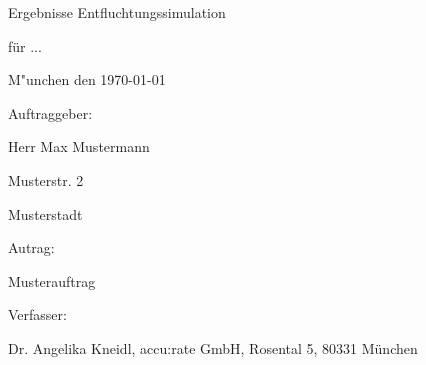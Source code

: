 \documentclass[paper=128mm:96mm, fontsize=8pt,pagesize, parskip=half-,
]{scrartcl}
\begin{document}
    \thispagestyle{empty}


    \begin{minipage}[b][130pt]{1\textwidth}
        \begin{flushright}
            \colorbox{accurateOrange}{\color{white}\begin{huge}
                                                       Ergebnisse Entfluchtungssimulation
            \end{huge}}\smallskip

            \colorbox{accurateOrange}{\color{white}\begin{huge}
                                                       f\"ur  ...
            \end{huge}}\smallskip

            \color{white} M"unchen den \today
        \end{flushright}
    \end{minipage}

    \clearpage

    Auftraggeber:

    \begin{small}
        \qquad Herr Max Mustermann

        \qquad Musterstr. 2

         Musterstadt
    \end{small}

    Autrag:

    \begin{small}
        \qquad Musterauftrag
    \end{small}

    Verfasser:

    \begin{small}
        \qquad Dr. Angelika Kneidl, accu:rate GmbH, Rosental 5, 80331 M\"unchen
    \end{small}
\end{document}

